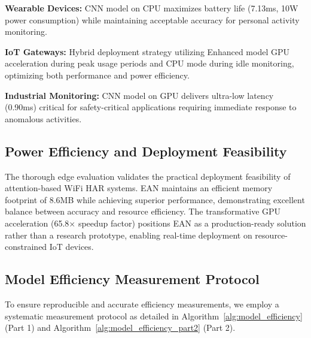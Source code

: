 \documentclass[lettersize,journal]{IEEEtran}
\begin{document}
\textbf{Wearable Devices:} CNN model on CPU maximizes battery life (7.13ms, 10W power consumption) while maintaining acceptable accuracy for personal activity monitoring.

\textbf{IoT Gateways:} Hybrid deployment strategy utilizing Enhanced model GPU acceleration during peak usage periods and CPU mode during idle monitoring, optimizing both performance and power efficiency.

\textbf{Industrial Monitoring:} CNN model on GPU delivers ultra-low latency (0.90ms) critical for safety-critical applications requiring immediate response to anomalous activities.

\subsection{Power Efficiency and Deployment Feasibility}

The thorough edge evaluation validates the practical deployment feasibility of attention-based WiFi HAR systems. EAN maintains an efficient memory footprint of 8.6MB while achieving superior performance, demonstrating excellent balance between accuracy and resource efficiency. The transformative GPU acceleration (65.8× speedup factor) positions EAN as a production-ready solution rather than a research prototype, enabling real-time deployment on resource-constrained IoT devices.

\subsection{Model Efficiency Measurement Protocol}

To ensure reproducible and accurate efficiency measurements, we employ a systematic measurement protocol as detailed in Algorithm~\ref{alg:model_efficiency} (Part 1) and Algorithm~\ref{alg:model_efficiency_part2} (Part 2).
\end{document}
